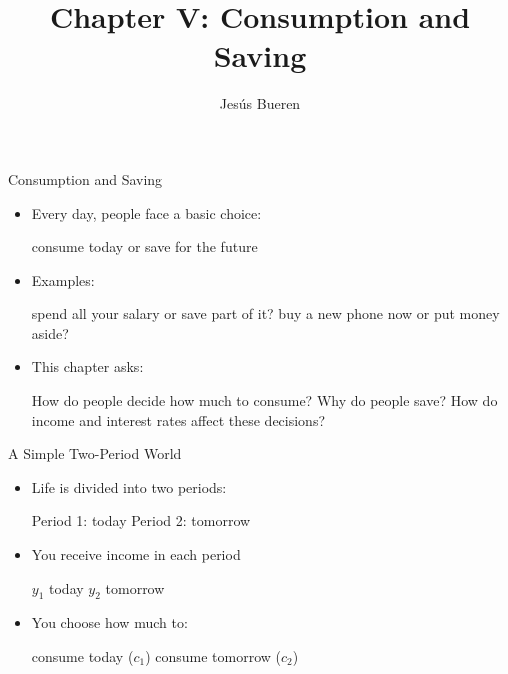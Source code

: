 \documentclass[10pt,aspectratio=169]{beamer}
\title[Consumption and Saving]{Chapter V: Consumption and Saving}
\author[Bueren]{Jes\'{u}s Bueren}
\institute{}
\date{}
\begin{document}
\begin{frame}[plain]
    \titlepage
\end{frame}

\begin{frame}{Consumption and Saving}

\begin{itemize}
    \item Every day, people face a basic choice:
    \begin{itemize}
        \itemvso consume today
        \itemvso or save for the future
    \end{itemize}
    \vspace{0.3cm}

    \item Examples:
    \begin{itemize}
        \itemvso spend all your salary or save part of it?
        \itemvso buy a new phone now or put money aside?
    \end{itemize}
    \vspace{0.3cm}

    \item This chapter asks:
    \begin{itemize}
        \itemvso How do people decide how much to consume?
        \itemvso Why do people save?
        \itemvso How do income and interest rates affect these decisions?
    \end{itemize}
\end{itemize}

\end{frame}

\begin{frame}{A Simple Two-Period World}

\begin{itemize}
    \item Life is divided into two periods:
    \begin{itemize}
        \itemvso Period 1: today
        \itemvso Period 2: tomorrow
    \end{itemize}
    \vspace{0.3cm}

    \item You receive income in each period
    \begin{itemize}
        \itemvso \(y_1\) today
        \itemvso \(y_2\) tomorrow
    \end{itemize}
    \vspace{0.3cm}

    \item You choose how much to:
    \begin{itemize}
        \itemvso consume today (\(c_1\))
        \itemvso consume tomorrow (\(c_2\))
    \end{itemize}
   
\end{itemize}

\end{frame}
\end{document}

